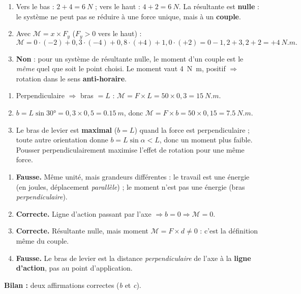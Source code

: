 \documentclass[11pt,a4paper]{article}
\begin{document}
\begin{corrige}
\begin{enumerate}[label=\alph*)]
  \item Vers le bas : $2+4=\qty{6}{N}$ ; vers le haut : $4+2=\qty{6}{N}$. La résultante est
        \textbf{nulle} : le système ne peut pas se réduire à une force unique, mais à un \textbf{couple}.
  \item Avec $\mathcal{M}=x\times F_y$ ($F_y>0$ vers le haut) :
        \[ \mathcal{M} = 0\cdot(-2) + 0{,}3\cdot(-4) + 0{,}8\cdot(+4) + 1{,}0\cdot(+2)
        = 0 - 1{,}2 + 3{,}2 + 2 = +\qty{4}{N.m}. \]
  \item \textbf{Non} : pour un système de résultante nulle, le moment d'un couple est le \emph{même}
        quel que soit le point choisi. Le moment vaut \qty{4}{N.m}, positif $\Rightarrow$ rotation dans
        le sens \textbf{anti-horaire}.
\end{enumerate}
\end{corrige}

\begin{corrige}
\begin{enumerate}[label=\alph*)]
  \item Perpendiculaire $\Rightarrow$ bras $=L$ : $\mathcal{M} = F\times L = 50\times 0{,}3 = \qty{15}{N.m}$.
  \item $b = L\sin\ang{30} = 0{,}3\times 0{,}5 = \qty{0.15}{m}$, donc
        $\mathcal{M} = F\times b = 50\times 0{,}15 = \qty{7.5}{N.m}$.
  \item Le bras de levier est \textbf{maximal} ($b=L$) quand la force est perpendiculaire ; toute autre
        orientation donne $b=L\sin\alpha < L$, donc un moment plus faible. Pousser perpendiculairement
        maximise l'effet de rotation pour une même force.
\end{enumerate}
\end{corrige}

\begin{corrige}
\begin{enumerate}[label=\alph*)]
  \item \textbf{Fausse.} Même unité, mais grandeurs différentes : le travail est une énergie (en
        joules, déplacement \emph{parallèle}) ; le moment n'est pas une énergie (bras
        \emph{perpendiculaire}).
  \item \textbf{Correcte.} Ligne d'action passant par l'axe $\Rightarrow b=0 \Rightarrow \mathcal{M}=0$.
  \item \textbf{Correcte.} Résultante nulle, mais moment $\mathcal{M}=F\times d\neq 0$ : c'est la
        définition même du couple.
  \item \textbf{Fausse.} Le bras de levier est la distance \emph{perpendiculaire} de l'axe à la
        \textbf{ligne d'action}, pas au point d'application.
\end{enumerate}
\textbf{Bilan :} deux affirmations correctes (\emph{b} et \emph{c}).
\end{corrige}
\end{document}
